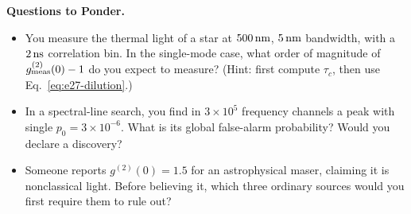 \medskip
\noindent\textbf{Questions to Ponder.}
\begin{itemize}
  \item You measure the thermal light of a star at \(500\,{\rm nm}\), \(5\,{\rm nm}\) bandwidth, with a \(2\,{\rm ns}\) correlation bin. In the single-mode case, what order of magnitude of \(g^{(2)}_{\rm meas}(0)-1\) do you expect to measure? (Hint: first compute \(\tau_c\), then use Eq.\ \eqref{eq:e27-dilution}.)
  \item In a spectral-line search, you find in \(3\times10^{5}\) frequency channels a peak with single \(p_0=3\times10^{-6}\). What is its global false-alarm probability? Would you declare a discovery?
  \item Someone reports \(g^{(2)}(0)=1.5\) for an astrophysical maser, claiming it is nonclassical light. Before believing it, which three ordinary sources would you first require them to rule out?
\end{itemize}
